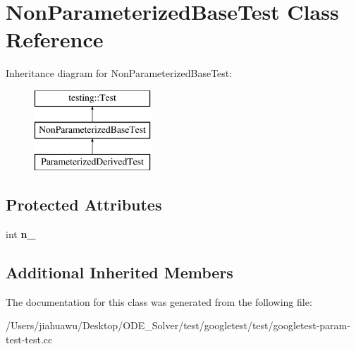 \hypertarget{class_non_parameterized_base_test}{}\section{Non\+Parameterized\+Base\+Test Class Reference}
\label{class_non_parameterized_base_test}
Inheritance diagram for Non\+Parameterized\+Base\+Test\+:\begin{figure}[H]
\begin{center}
\leavevmode
\includegraphics[height=3.000000cm]{class_non_parameterized_base_test}
\end{center}
\end{figure}
\subsection*{Protected Attributes}
\begin{DoxyCompactItemize}
\item 
\mbox{\label{class_non_parameterized_base_test_a617d4bbfd2aa5f6d41eea3089f7ad039}} 
int {\bfseries n\+\_\+}
\end{DoxyCompactItemize}
\subsection*{Additional Inherited Members}


The documentation for this class was generated from the following file\+:\begin{DoxyCompactItemize}
\item 
/\+Users/jiahuawu/\+Desktop/\+O\+D\+E\+\_\+\+Solver/test/googletest/test/googletest-\/param-\/test-\/test.\+cc\end{DoxyCompactItemize}
